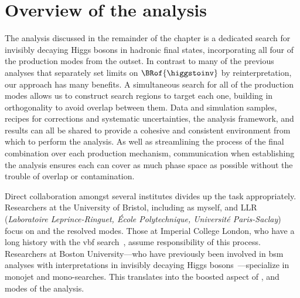 

\section{Overview of the analysis}
\label{sec:htoinv_analysis_overview}

The analysis discussed in the remainder of the chapter is a dedicated search for invisibly decaying Higgs bosons in hadronic final states, incorporating all four of the production modes from the outset. In contrast to many of the previous analyses that separately set limits on $\BRof{\higgstoinv}$ by reinterpretation, our approach has many benefits. A simultaneous search for all of the production modes allows us to construct search regions to target each one, building in orthogonality to avoid overlap between them. Data and simulation samples, recipes for corrections and systematic uncertainties, the analysis framework, and results can all be shared to provide a cohesive and consistent environment from which to perform the analysis. As well as streamlining the process of the final combination over each production mechanism, communication when establishing the analysis ensures each can cover as much phase space as possible without the trouble of overlap or contamination.

Direct collaboration amongst several institutes divides up the task appropriately. Researchers at the University of Bristol, including as myself, and LLR (\emph{Laboratoire Leprince-Ringuet, \'{E}cole Polytechnique, Universit\'{e} Paris-Saclay}) focus on \ttH and the resolved \VH modes. Those at Imperial College London, who have a long history with the \acrshort{vbf} search~\cite{Chatrchyan:2014tja,Sirunyan:2018owy}, assume responsibility of this process. Researchers at Boston University---who have previously been involved in \acrshort{bsm} analyses with interpretations in invisibly decaying Higgs bosons~\cite{Khachatryan:2016mdm,Sirunyan:2017jix}---specialize in monojet and mono-\PVec searches. This translates into the boosted aspect of \VH, and \ggH modes of the analysis.

